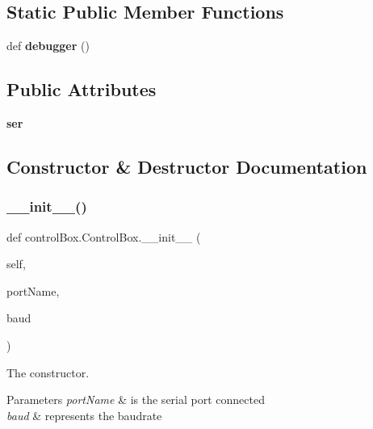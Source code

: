\subsection*{Static Public Member Functions}
\begin{DoxyCompactItemize}
\item 
\mbox{\label{classcontrol_box_1_1_control_box_a2c3b6b812314670ac48fa37a39f19af1}} 
def {\bfseries debugger} ()
\end{DoxyCompactItemize}
\subsection*{Public Attributes}
\begin{DoxyCompactItemize}
\item 
\mbox{\label{classcontrol_box_1_1_control_box_a2d6692df23989622b24b4bf6ff6da742}} 
{\bfseries ser}
\end{DoxyCompactItemize}


\subsection{Constructor \& Destructor Documentation}
\mbox{\label{classcontrol_box_1_1_control_box_a29fb59eec02ca1447e3a06d4dae11386}} 
\subsubsection{\texorpdfstring{\+\_\+\+\_\+init\+\_\+\+\_\+()}{\_\_init\_\_()}}
{\footnotesize\ttfamily def control\+Box.\+Control\+Box.\+\_\+\+\_\+init\+\_\+\+\_\+ (\begin{DoxyParamCaption}\item[{}]{self,  }\item[{}]{port\+Name,  }\item[{}]{baud }\end{DoxyParamCaption})}



The constructor. 


\begin{DoxyParams}{Parameters}
{\em port\+Name} & is the serial port connected \\
\hline
{\em baud} & represents the baudrate \\
\hline
\end{DoxyParams}


